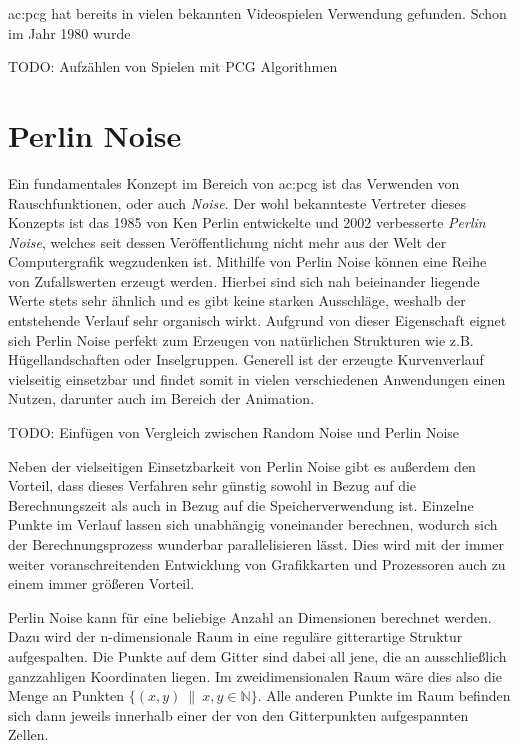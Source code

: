 \gls{ac:pcg} hat bereits in vielen bekannten Videospielen Verwendung gefunden. Schon im Jahr 1980 wurde %

TODO: Aufzählen von Spielen mit PCG Algorithmen

\section{Perlin Noise}
Ein fundamentales Konzept im Bereich von \gls{ac:pcg} ist das Verwenden von Rauschfunktionen, oder auch \textit{Noise}.
Der wohl bekannteste Vertreter dieses Konzepts ist das 1985 von Ken Perlin entwickelte \cite{16_perlin} und 2002 verbesserte \cite{18_perlin}
\textit{Perlin Noise}, welches seit dessen Veröffentlichung nicht mehr aus der Welt der Computergrafik wegzudenken ist. Mithilfe von
Perlin Noise können eine Reihe von Zufallswerten erzeugt werden. Hierbei sind sich nah beieinander liegende Werte stets sehr ähnlich und es
gibt keine starken Ausschläge, weshalb der entstehende Verlauf sehr organisch wirkt. Aufgrund von dieser Eigenschaft eignet sich Perlin Noise
perfekt zum Erzeugen von natürlichen Strukturen wie z.B. Hügellandschaften oder Inselgruppen. Generell ist der erzeugte Kurvenverlauf vielseitig
einsetzbar und findet somit in vielen verschiedenen Anwendungen einen Nutzen, darunter auch im Bereich der Animation. \cite{17_lagae_et_al}

TODO: Einfügen von Vergleich zwischen Random Noise und Perlin Noise

Neben der vielseitigen Einsetzbarkeit von Perlin Noise gibt es außerdem den Vorteil, dass dieses Verfahren sehr günstig sowohl in Bezug auf
die Berechnungszeit als auch in Bezug auf die Speicherverwendung ist. Einzelne Punkte im Verlauf lassen sich unabhängig voneinander berechnen,
wodurch sich der Berechnungsprozess wunderbar parallelisieren lässt. Dies wird mit der immer weiter voranschreitenden Entwicklung von
Grafikkarten und Prozessoren auch zu einem immer größeren Vorteil. \cite{17_lagae_et_al}

Perlin Noise kann für eine beliebige Anzahl an Dimensionen berechnet werden. Dazu wird der n-dimensionale Raum in eine reguläre gitterartige
Struktur aufgespalten. Die Punkte auf dem Gitter sind dabei all jene, die an ausschließlich ganzzahligen Koordinaten liegen. Im zweidimensionalen
Raum wäre dies also die Menge an Punkten \(\{(x, y) \ \| \ x, y \in \mathbb{N}\}\). Alle anderen Punkte im Raum befinden sich dann jeweils innerhalb
einer der von den Gitterpunkten aufgespannten Zellen.

